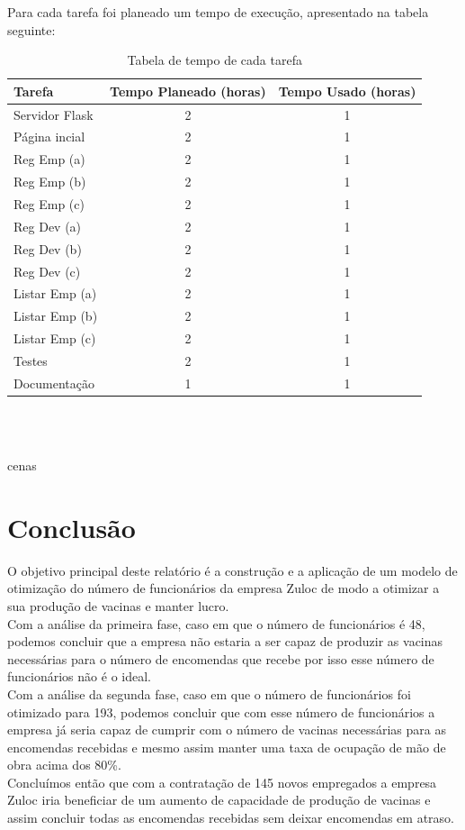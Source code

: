 \documentclass[12pt, a4paper, twoside]{article}
\begin{document}
\newpage
Para cada tarefa foi planeado um tempo de execução, apresentado na tabela seguinte:
\begin{table}[h]
\centering
\begin{tabular}{l|c|c}

Tarefa 			& Tempo Planeado (horas) & Tempo Usado (horas) \\ \hline
Servidor Flask  & 2              & 1           \\
Página incial   & 2              & 1           \\
Reg Emp (a)     & 2              & 1           \\
Reg Emp (b)     & 2              & 1           \\
Reg Emp (c)     & 2              & 1           \\
Reg Dev (a)     & 2              & 1           \\
Reg Dev (b)     & 2              & 1           \\
Reg Dev (c)     & 2              & 1           \\
Listar Emp (a)  & 2              & 1           \\
Listar Emp (b)  & 2              & 1           \\
Listar Emp (c)  & 2              & 1           \\
Testes          & 2              & 1           \\
Documentação    & 1              & 1          

\end{tabular}
\\~\\
\caption{Tabela de tempo de cada tarefa}
\end{table}

cenas


\clearpage
\newpage
\section{Conclusão}

O objetivo principal deste relatório é a construção e a aplicação de um modelo de otimização do número de funcionários da empresa Zuloc de modo a otimizar a sua produção de vacinas e manter lucro.\\
Com a análise da primeira fase, caso em que o número de funcionários é 48, podemos concluir que a empresa não estaria a ser capaz de produzir as vacinas necessárias para o número de encomendas que recebe por isso esse número de funcionários não é o ideal.\\
Com a análise da segunda fase, caso em que o número de funcionários foi otimizado para 193, podemos concluir que com esse número de funcionários a empresa já seria capaz de cumprir com o número de vacinas necessárias para as encomendas recebidas e mesmo assim manter uma taxa de ocupação de mão de obra acima dos 80\%.\\
Concluímos então que com a contratação de 145 novos empregados a empresa Zuloc iria beneficiar de um aumento de capacidade de produção de vacinas e assim concluir todas as encomendas recebidas sem deixar encomendas em atraso.

\end{document}
